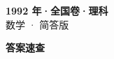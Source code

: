 \documentclass[zihao=-4, a4paper]{ctexart}
\begin{document}
\begin{center}
  {\Large\bfseries 1992 年·全国卷·理科}\\[4pt]
  {\large 数学 · 简答版}
\end{center}
\medskip
{}

\clearpage
{}
\begin{center}{\Large\bfseries 答案速查}\end{center}
\medskip

\end{document}
